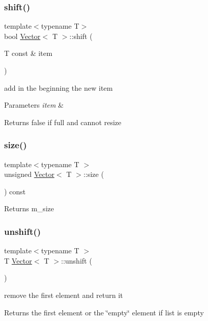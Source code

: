 \subsubsection{\texorpdfstring{shift()}{shift()}}
{\footnotesize\ttfamily template$<$typename T$>$ \\
bool \hyperlink{classVector}{Vector}$<$ T $>$\+::shift (\begin{DoxyParamCaption}\item[{T const \&}]{item }\end{DoxyParamCaption})}

add in the beginning the new item 
\begin{DoxyParams}{Parameters}
{\em item} & \\
\hline
\end{DoxyParams}
\begin{DoxyReturn}{Returns}
false if full and cannot resize 
\end{DoxyReturn}
\mbox{\label{classVector_a7eef7a769093f4486f3b2083436bf270}} 
\subsubsection{\texorpdfstring{size()}{size()}}
{\footnotesize\ttfamily template$<$typename T $>$ \\
unsigned \hyperlink{classVector}{Vector}$<$ T $>$\+::size (\begin{DoxyParamCaption}{ }\end{DoxyParamCaption}) const}

\begin{DoxyReturn}{Returns}
m\+\_\+size 
\end{DoxyReturn}
\mbox{\label{classVector_a4fda2f9168cac24815062130bada9a8d}} 
\subsubsection{\texorpdfstring{unshift()}{unshift()}}
{\footnotesize\ttfamily template$<$typename T $>$ \\
T \hyperlink{classVector}{Vector}$<$ T $>$\+::unshift (\begin{DoxyParamCaption}{ }\end{DoxyParamCaption})}

remove the first element and return it \begin{DoxyReturn}{Returns}
the first element or the \char`\"{}empty\char`\"{} element if list is empty 
\end{DoxyReturn}


